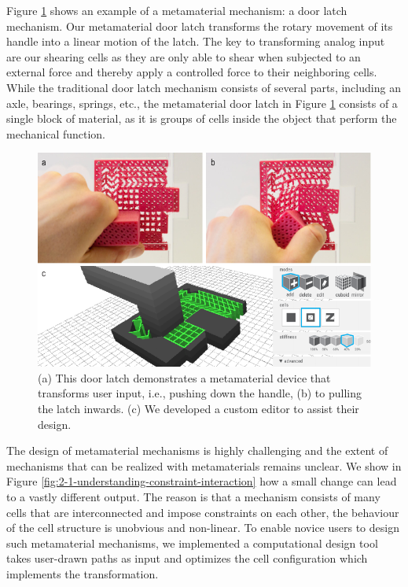 Figure \ref{fig:2-overview-metamaterial-mechanisms} shows an example of a metamaterial mechanism: a door latch mechanism. Our metamaterial door latch transforms the rotary movement of its handle into a linear motion of the latch. The key to transforming analog input are our shearing cells as they are only able to shear when subjected to an external force and thereby apply a controlled force to their neighboring cells.  While the traditional door latch mechanism consists of several parts, including an axle, bearings, springs, etc., the metamaterial door latch in Figure \ref{fig:2-overview-metamaterial-mechanisms} consists of a single block of material, as it is groups of cells inside the object that perform the mechanical function.

\begin{figure} [h] %
    \centering
    \includegraphics[width=1\textwidth]{chapters/introduction-FIG/2-overview-metamaterial-mechanisms.pdf}
    \caption[Short figure name.]{(a) This door latch demonstrates a metamaterial device that transforms user input, i.e., pushing down the handle, (b) to pulling the latch inwards. (c) We developed a custom editor to assist their design.
    \label{fig:2-overview-metamaterial-mechanisms}}
\end{figure}


The design of metamaterial mechanisms is highly challenging and the extent of mechanisms that can be realized with metamaterials remains unclear. 
We show in Figure \ref{fig:2-1-understanding-constraint-interaction} how a small change can lead to a vastly different output. 
The reason is that a mechanism consists of many cells that are interconnected and impose constraints on each other, the behaviour of the cell structure is unobvious and non-linear. 
To enable novice users to design such metamaterial mechanisms, we implemented a computational design tool takes user-drawn paths as input and optimizes the cell configuration which implements the transformation. 


